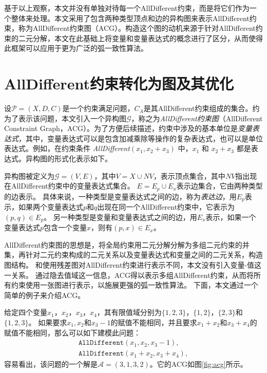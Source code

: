 基于以上观察，本文并没有单独对待每一个AllDifferent约束，而是将它们作为一个整体来处理。本文采用了包含两种类型顶点和边的异构图来表示AllDifferent约束，称为AllDifferent约束图（ACG）。构造这个图的动机来源于针对AllDifferent约束的二元分解，本文在此基础上将变量和变量表达式的概念进行了区分，从而使得此框架可以应用于更为广泛的弧一致性算法。


\section{AllDifferent约束转化为图及其优化}
设$\mathcal{P} = (X, D, C)$是一个约束满足问题，$C_A$是其AllDifferent约束组成的集合。约为了表示该问题，本文引入一个异构图$\mathcal{G}$，称之为\textit{AllDifferent约束图}（AllDifferent Constraint Graph，ACG）。为了方便后续描述，约束中涉及的基本单位是\textit{变量表达式}，其中，变量表达式可以是包含加减乘除等操作的复杂表达式，也可以是单位表达式。例如，在约束条件 {\it AllDifferent}$(x_1, x_2+x_3)$ 中，$x_1$ 和 $x_2+x_3$ 都是表达式。异构图的形式化表示如下。

\begin{definition}
    异构图被定义为$\mathcal{G} = (V, E)$，其中$V = X\cup NV$，表示顶点集合，其中$NV$指出现在AllDifferent约束中的变量表达式集合。
    $E = E_p \cup E_x$表示边集合，它由两种类型的边表示。
    具体来说，一种类型是变量表达式之间的边，称为\textit{表达边}，用$E_p$表示，如果两个变量表达式$p$和$q$出现在同一个AllDifferent约束中，它表示为$(p, q) \in E_p$。
    另一种类型是变量和变量表达式之间的边，用$E_x$表示，如果一个变量表达式$p$包含一个变量$x$，则有$(p, x) \in E_x$。
\end{definition}

AllDifferent约束图的思想是，将全局约束用二元分解分解为多组二元约束的并集，再针对二元约束构成的二元关系以及变量表达式和变量之间的二元关系，构造图结构。
和使用残差图对AllDifferent约束进行表示不同，本文没有引入变量-值这一关系。
通过隐去值域这一信息，ACG得以表示多组AllDifferent约束，从而将所有约束使用一张图进行表示，以施展更强的弧一致性算法。
下面，本文通过一个简单的例子来介绍ACG。

\begin{example}\label{exp:acg}
    给定四个变量$x_1$，$x_2$，$x_3$，$x_4$，其有限值域分别为$\{1, 2, 3\}$，$\{1, 2\}$，$\{2, 3\}$和$\{1, 2, 3\}$。
    如果要求$x_1, x_2$和$x_3-1$的赋值不能相同，并且要求$x_1+x_2$和$x_3+x_4$的赋值不能相同，那么可以如下建模此问题：
        \begin{align}
            &\texttt {AllDifferent} (x_1, x_2, x_3-1), & \\
            &\texttt {AllDifferent} (x_1+x_2, x_3+x_4), &
        \end{align}%
    容易看出，该问题的一个解是$\mathcal{A}=(3, 1, 3, 2)$。它的ACG如图\ref{fig:acg}所示。
\end{example}

